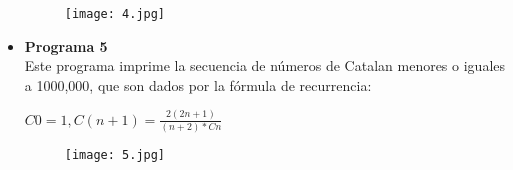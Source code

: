 \documentclass[a4paper]{article}
\begin{document}
\begin{itemize}
\begin{figure}[H]
	\centering
	\texttt{[image: 4.jpg]}
\end{figure}

\item \textbf{Programa 5} \\
Este programa imprime la secuencia de números de Catalan menores o iguales a 1000,000, que son dados por la fórmula de recurrencia:

$C0 = 1, C(n+1) = \frac{2(2n+1)}{(n+2)*Cn}$

\begin{figure}[H]
	\centering
	\texttt{[image: 5.jpg]}
\end{figure}

\end{itemize}
\end{document}
